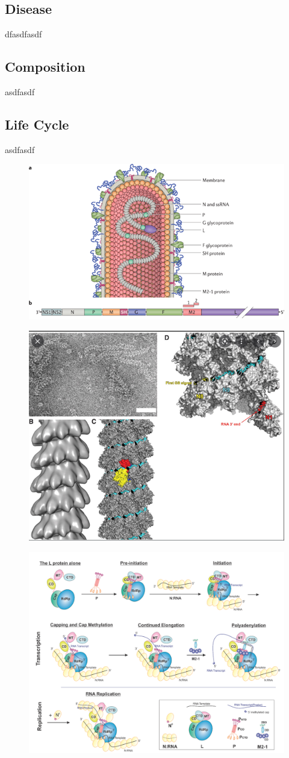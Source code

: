 \subsection{Disease} \label{subsec:Disease}
dfasdfasdf




\subsection{Composition} \label{subsec:Composition}
asdfasdf




\subsection{Life Cycle} \label{subsec:Life Cycle}
asdfasdf

\begin{figure}
    \centering
    \includegraphics[width=0.5\linewidth]{04. Introduction//Figs/07. RSV-composition.png}

    
\end{figure}

\begin{figure}
    \centering
    \includegraphics[width=0.5\linewidth]{04. Introduction//Figs/08. N-structure.png}
    
    
\end{figure}

\begin{figure}
    \centering
    \includegraphics[width=0.5\linewidth]{04. Introduction//Figs/09. N_p_l_m21-interaction-overview.png}
    
    
\end{figure}


